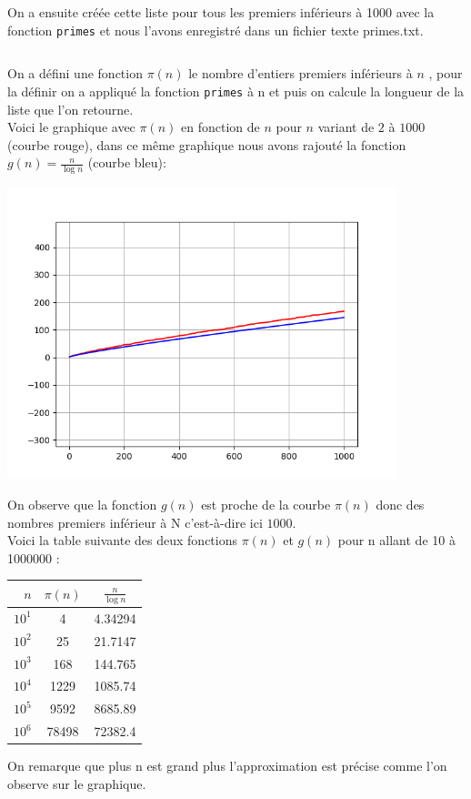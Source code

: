 \documentclass{article}
\begin{document}
On a ensuite créée cette liste pour tous les premiers inférieurs à 1000 avec la fonction \texttt{primes} et nous l'avons enregistré dans un fichier texte primes.txt.

$$ $$

$$ $$
On a défini une fonction $\pi(n)$ le nombre d'entiers premiers inférieurs à $n$ , pour la définir on a appliqué la fonction \texttt{primes} à n et puis on calcule la longueur de la liste que l'on retourne. 
\\
Voici le graphique avec $\pi(n)$ en fonction de $n$ pour $n$ variant de $2$ à $1000$ (courbe rouge), dans ce même graphique nous avons rajouté la fonction $g(n) = \frac{n}{\log n}$ (courbe bleu):

\includegraphics[width=0.85\textwidth]{graph.png}
$$ $$

On observe que la fonction $g(n)$ est proche de la courbe $\pi(n)$ donc des nombres premiers inférieur à N c'est-à-dire ici $1000$.
$$ $$
Voici la table suivante des deux fonctions $\pi(n)$ et $g(n)$ pour n allant de 10 à 1000000 :

\begin{center}
\begin{tabular}{r | c | c}
$n$ & $\pi(n)$ & $\frac{n}{\log n}$ \\
\hline
$10^1$ & {4} & {4.34294}\\
$10^2$ & {25} & {21.7147}\\
$10^3$ & {168} & {144.765}\\
$10^4$ & {1229} & {1085.74}\\
$10^5$ & {9592} & {8685.89}\\
$10^6$ & {78498} & {72382.4}
\end{tabular}
\end{center}
 On remarque que plus n est grand plus l'approximation est précise comme l'on observe sur le graphique.
\end{document}
